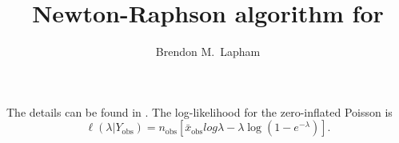 \documentclass[a4paper,10pt]{article}
\title{Newton-Raphson algorithm for \citet{meng1997em}}
\author{Brendon M.\ Lapham}
\begin{document}
  
 \maketitle

The details can be found in \citet{meng1997em}.
The log-likelihood for the zero-inflated Poisson is
$$ \ell(\lambda |Y_{\text{obs}}) = n_\text{obs}[\bar x_\text{obs} log \lambda - \lambda \log(1-e^{-\lambda}) ].   $$
 






\end{document}
